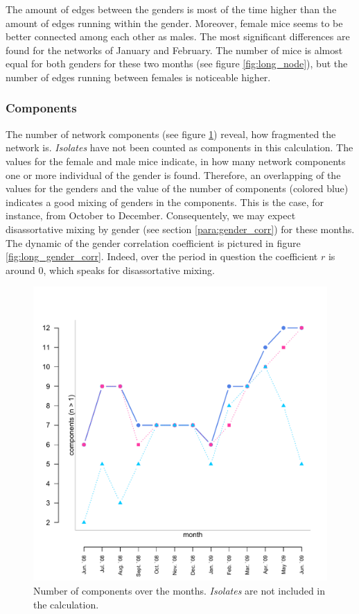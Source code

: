 The amount of edges between the genders is most of the time higher than the amount of edges running within the gender. Moreover, female mice seems to be better connected among each other as males. The most significant differences are found for the networks of January and February. The number of mice is almost equal for both genders for these two months (see figure \ref{fig:long_node}), but the number of edges running between females is noticeable higher. 
      
\subsubsection{Components}

The number of network components (see figure \ref{fig:long_comps}) reveal, how fragmented  the network is. \textit{Isolates} have not been counted as components in this calculation. The values for the female and male mice indicate, in how many network components one or more individual of the gender is found. Therefore, an overlapping of the values for the genders and the value of the number of components (colored blue) indicates a good mixing of genders in the components. This is the case, for instance, from October to December. Consequentely, we may expect disassortative mixing by gender (see section \ref{para:gender_corr}) for these months. The dynamic of the gender correlation coefficient is pictured in figure \ref{fig:long_gender_corr}. Indeed, over the period in question the coefficient $r$ is around 0, which speaks for disassortative mixing.

\begin{figure}[htpb]
\begin{center}
  \includegraphics[width=.6\textwidth]{assets/pdf/long_comps.pdf}
  \caption[Number of components over the months]{Number of components over the months. \textit{Isolates} are not included in the calculation.}
  \label{fig:long_comps}
\end{center}
\end{figure}


